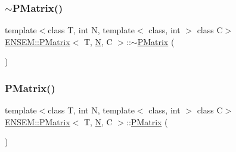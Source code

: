 \mbox{\label{classENSEM_1_1PMatrix_a3196ba50adba3cc1e72bb29ce0b02cda}} 
\subsubsection{\texorpdfstring{$\sim$PMatrix()}{~PMatrix()}\hspace{0.1cm}{\footnotesize\ttfamily [1/3]}}
{\footnotesize\ttfamily template$<$class T, int N, template$<$ class, int $>$ class C$>$ \\
\mbox{\hyperlink{classENSEM_1_1PMatrix}{E\+N\+S\+E\+M\+::\+P\+Matrix}}$<$ T, \mbox{\hyperlink{adat__devel_2lib_2hadron_2operator__name__util_8cc_a7722c8ecbb62d99aee7ce68b1752f337}{N}}, C $>$\+::$\sim$\mbox{\hyperlink{classENSEM_1_1PMatrix}{P\+Matrix}} (\begin{DoxyParamCaption}{ }\end{DoxyParamCaption})\hspace{0.3cm}{\ttfamily [inline]}}

\mbox{\label{classENSEM_1_1PMatrix_ae32acebccb43c577a9e4dde0866a6c78}} 
\subsubsection{\texorpdfstring{PMatrix()}{PMatrix()}\hspace{0.1cm}{\footnotesize\ttfamily [2/3]}}
{\footnotesize\ttfamily template$<$class T, int N, template$<$ class, int $>$ class C$>$ \\
\mbox{\hyperlink{classENSEM_1_1PMatrix}{E\+N\+S\+E\+M\+::\+P\+Matrix}}$<$ T, \mbox{\hyperlink{adat__devel_2lib_2hadron_2operator__name__util_8cc_a7722c8ecbb62d99aee7ce68b1752f337}{N}}, C $>$\+::\mbox{\hyperlink{classENSEM_1_1PMatrix}{P\+Matrix}} (\begin{DoxyParamCaption}{ }\end{DoxyParamCaption})\hspace{0.3cm}{\ttfamily [inline]}}

\mbox{\label{classENSEM_1_1PMatrix_a3196ba50adba3cc1e72bb29ce0b02cda}} 
